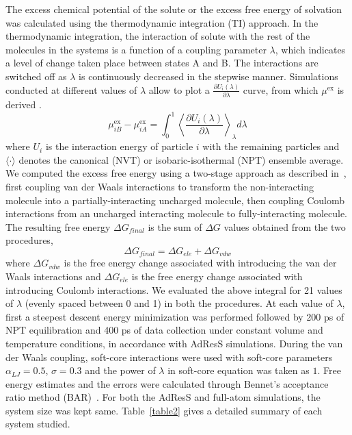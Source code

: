 \documentclass[a4paper,preprint,unsortedaddress]{revtex4-1}
\newcommand{\recheck}[1]{{\color{red} #1}}
\newcommand{\exc}{{\textrm{ex}}}
\begin{document}
The excess chemical potential of the solute or the excess free energy of solvation was calculated using the 
thermodynamic integration (TI) approach. In the thermodynamic integration, the 
interaction of solute with the rest of the molecules in the systems is a function 
of a coupling parameter $\lambda$, which indicates a level of change taken place between states
A and B. The interactions are switched off as $\lambda$ is 
continuously decreased in the stepwise manner. Simulations conducted at different values of 
$\lambda$ allow to plot a \recheck{$\frac{\partial U_{i}(\lambda)}{\partial \lambda}$} curve, from which 
$\mu^{\exc}$ is derived \cite{mu}. 
\recheck{
\begin{equation}
 \mu^\exc_{iB} - \mu^\exc_{iA} = \int_{0}^{1} \left \langle \frac{\partial U_{i}(\lambda)}{\partial \lambda} \right \rangle_{\lambda} d\lambda 
\end{equation}
}
where $U_{i}$ is the interaction energy of particle $i$ with the remaining particles and $\langle \cdot \rangle$
denotes the canonical (NVT) or isobaric-isothermal (NPT) ensemble average. We computed the excess 
free energy using a two-stage approach as described in~\cite{mobley}, first coupling van der Waals interactions to transform the 
non-interacting molecule into a partially-interacting uncharged molecule, then coupling Coulomb
interactions from an uncharged interacting molecule to fully-interacting molecule. The resulting 
free energy $\Delta G_{final}$ is the sum of $\Delta G$ values obtained from the two procedures,
\begin{equation}
 \Delta G_{final} = \Delta G_{ele} + \Delta G_{vdw}
\end{equation}
where $\Delta G_{vdw}$ is the free energy change associated with introducing the van der Waals interactions and 
$\Delta G_{ele}$ is the free energy change associated with introducing Coulomb interactions. 
We evaluated the above integral for 21 values of $\lambda$ (evenly spaced between 0 and 1) in both the procedures.
At each value of $\lambda$, first a steepest descent energy minimization was performed followed 
by 200 ps of NPT equilibration and 400 ps of data collection under constant volume and temperature
conditions, in accordance with AdResS simulations. 
During the van der Waals coupling, soft-core interactions were used with soft-core parameters $\alpha_{LJ} = 0.5$, 
$\sigma = 0.3$ and the power of $\lambda$ in soft-core equation was taken as $1$. Free energy estimates and the errors
were calculated through Bennet's acceptance ratio method (BAR)~\cite{bar}. 
For both the AdResS and full-atom simulations, the system size was kept same.
\recheck{Table~\ref{table2} gives a detailed summary of each system studied}.\\
\end{document}
